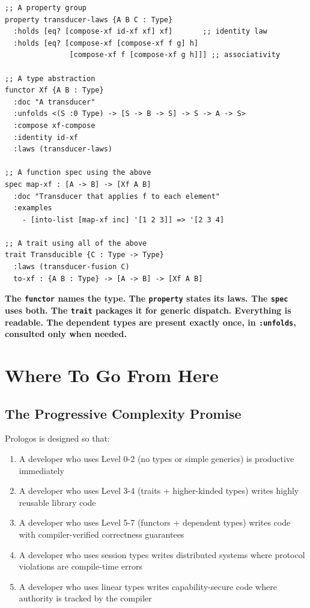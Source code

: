 \documentclass[11pt]{article}
\begin{document}
\begin{verbatim}
;; A property group
property transducer-laws {A B C : Type}
  :holds [eq? [compose-xf id-xf xf] xf]       ;; identity law
  :holds [eq? [compose-xf [compose-xf f g] h]
               [compose-xf f [compose-xf g h]]] ;; associativity

;; A type abstraction
functor Xf {A B : Type}
  :doc "A transducer"
  :unfolds <(S :0 Type) -> [S -> B -> S] -> S -> A -> S>
  :compose xf-compose
  :identity id-xf
  :laws (transducer-laws)

;; A function spec using the above
spec map-xf : [A -> B] -> [Xf A B]
  :doc "Transducer that applies f to each element"
  :examples
    - [into-list [map-xf inc] '[1 2 3]] => '[2 3 4]

;; A trait using all of the above
trait Transducible {C : Type -> Type}
  :laws (transducer-fusion C)
  to-xf : {A B : Type} -> [A -> B] -> [Xf A B]
\end{verbatim}

\textbf{The \texttt{functor} names the type. The \texttt{property} states its laws. The
\texttt{spec} uses both. The \texttt{trait} packages it for generic dispatch.
Everything is readable. The dependent types are present exactly once,
in \texttt{:unfolds}, consulted only when needed.}
\section{Where To Go From Here}
\label{sec:orgc02717d}

\subsection{The Progressive Complexity Promise}
\label{sec:org7e8ecd6}

Prologos is designed so that:

\begin{enumerate}
\item A developer who uses Level 0-2 (no types or simple generics) is
productive immediately
\item A developer who uses Level 3-4 (traits + higher-kinded types) writes
highly reusable library code
\item A developer who uses Level 5-7 (functors + dependent types) writes
code with compiler-verified correctness guarantees
\item A developer who uses session types writes distributed systems where
protocol violations are compile-time errors
\item A developer who uses linear types writes capability-secure code where
authority is tracked by the compiler
\end{enumerate}
\end{document}
